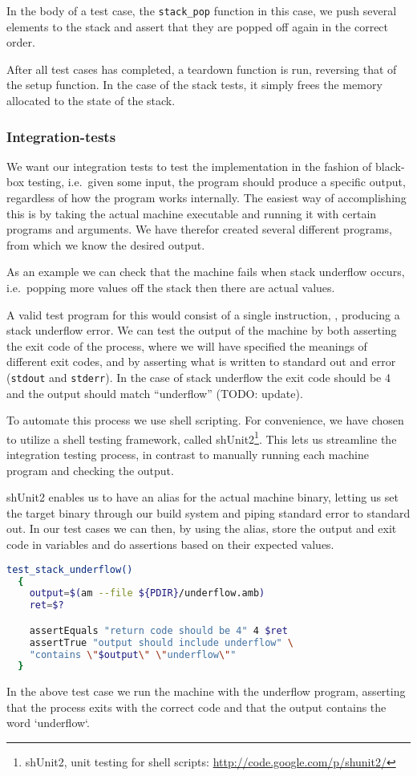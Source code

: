 In the body of a test case, the {\tt stack\_pop} function in this case, we push
several elements to the stack and assert that they are popped off again in the
correct order.

After all test cases has completed, a teardown function is run, reversing that
of the setup function. In the case of the stack tests, it simply frees the
memory allocated to the state of the stack.

\subsubsection{Integration-tests}

We want our integration tests to test the implementation in the fashion of
black-box testing, i.e.~given some input, the program should produce a specific
output, regardless of how the program works internally. The easiest way of
accomplishing this is by taking the actual machine executable and running it
with certain programs and arguments. We have therefor created several different
programs, from which we know the desired output.

As an example we can check that the machine fails when stack underflow occurs,
i.e.\ popping more values off the stack then there are actual values.

A valid test program for this would consist of a single instruction, , producing a stack underflow error. We can test the output of the machine
by both asserting the exit code of the process, where we will have specified the
meanings of different exit codes, and by asserting what is written to standard
out and error ({\tt stdout} and {\tt stderr}). In the case of stack underflow
the exit code should be 4 and the output should match ``underflow'' (TODO:
update).

To automate this process we use shell scripting. For convenience, we have chosen
to utilize a shell testing framework, called shUnit2\footnote{shUnit2, unit
  testing for shell scripts: \url{http://code.google.com/p/shunit2/}}. This lets
us streamline the integration testing process, in contrast to manually running
each machine program and checking the output.

shUnit2 enables us to have an alias for the actual machine binary, letting us
set the target binary through our build system and piping standard error to
standard out. In our test cases we can then, by using the alias, store the
output and exit code in variables and do assertions based on their expected
values.
\begin{lstlisting}[language={sh},caption={shUnit2 underflow test case}]
  test_stack_underflow()
  {
    output=$(am --file ${PDIR}/underflow.amb)
    ret=$?

    assertEquals "return code should be 4" 4 $ret
    assertTrue "output should include underflow" \
    "contains \"$output\" \"underflow\""
  }
\end{lstlisting}

In the above test case we run the machine with the underflow program, asserting
that the process exits with the correct code and that the output contains the
word `underflow`.
